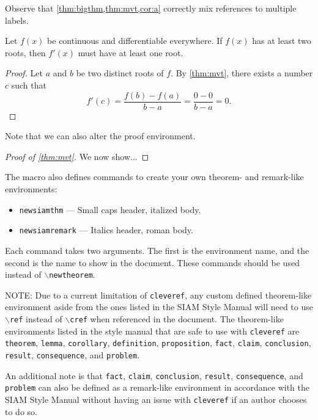 \documentclass[twoside,leqno,twocolumn]{article}
\begin{document}
Observe that \cref{thm:bigthm,thm:mvt,cor:a} correctly mix references
to multiple labels.

\begin{corollary}\label{cor:a}
  Let $f(x)$ be continuous and differentiable everywhere. If $f(x)$
  has at least two roots, then $f'(x)$ must have at least one root.
\end{corollary}
\begin{proof}
  Let $a$ and $b$ be two distinct roots of $f$.
  By \cref{thm:mvt}, there exists a number $c$ such that
  \begin{displaymath}
    f'(c) = \frac{f(b)-f(a)}{b-a} = \frac{0-0}{b-a} = 0.
  \end{displaymath}
\end{proof}
Note that we can also alter the proof environment.
\begin{proof}[Proof of \cref{thm:mvt}]
We now show...
\end{proof}

The macro also defines commands to create your own theorem- and
remark-like environments:
\begin{itemize}[nosep]
\item \texttt{newsiamthm} --- Small caps header, italized body. 
\item \texttt{newsiamremark} --- Italics header, roman body.
\end{itemize}
Each command takes two arguments. The first is the environment name,
and the second is the name to show in the document. These commands should
be used instead of $\backslash$\texttt{newtheorem}.

NOTE: Due to a current limitation of \texttt{cleveref}, any custom defined theorem-like environment 
aside from the ones listed in the SIAM Style Manual \cite[Chapter 6]{siam} will need to use $\backslash$\texttt{ref} 
instead of $\backslash$\texttt{cref} when referenced in the document.  The theorem-like
environments listed in the style manual that are safe to use with \texttt{cleveref} are 
\texttt{theorem}, 
\texttt{lemma}, 
\texttt{corollary},
\texttt{definition},
\texttt{proposition},
\texttt{fact}, 
\texttt{claim}, 
\texttt{conclusion},
\texttt{result}, 
\texttt{consequence}, and
\texttt{problem}.

An additional note is that 
\texttt{fact}, 
\texttt{claim}, 
\texttt{conclusion},
\texttt{result}, 
\texttt{consequence}, and
\texttt{problem} 
can also be defined as a remark-like environment in accordance with the SIAM Style Manual \cite[Chapter 6]{siam} without having 
an issue with \texttt{cleveref} if an author chooses to do so.
\end{document}
